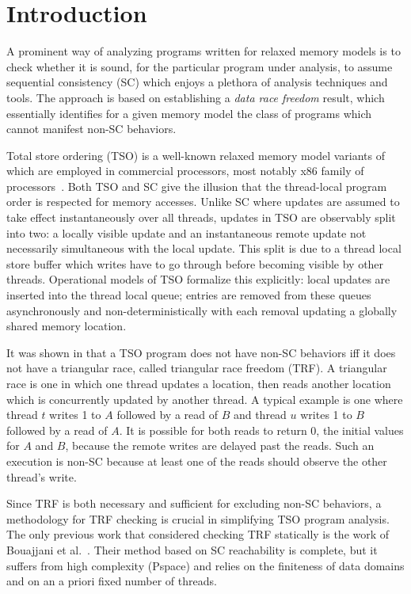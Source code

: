 \documentclass[preprint,9pt]{sigplanconf}
\begin{document}


\section{Introduction}
\label{sec:intro}
A prominent way of analyzing programs written for relaxed memory models is to check whether it is sound, for the particular program under analysis, to assume sequential consistency (SC) which enjoys a plethora of analysis techniques and tools.
The approach is based on establishing a {\em data race freedom} result, which essentially identifies for a given memory model the class of programs which cannot manifest non-SC behaviors.

Total store ordering (TSO) is a well-known relaxed memory model variants of which are employed in commercial processors, most notably x86 family of processors~\cite{SSO+2010}.
Both TSO and SC give the illusion that the thread-local program order is respected for memory accesses.
Unlike SC where updates are assumed to take effect instantaneously over all threads, updates in TSO are observably split into two: a locally visible update and an instantaneous remote update not necessarily simultaneous with the local update.
This split is due to a thread local store buffer which writes have to go through before becoming visible by other threads.
Operational models of TSO formalize this explicitly: local updates are inserted into the thread local queue; entries are removed from these queues asynchronously and non-deterministically with each removal updating a globally shared memory location. 

It was shown in \cite{Owe2010} that a TSO program does not have non-SC behaviors iff it does not have a triangular race, called triangular race freedom (TRF).
A triangular race is one in which one thread updates a location, then reads another location which is concurrently updated by another thread.
A typical example is one where thread $t$ writes 1 to $A$ followed by a read of $B$ and thread $u$ writes 1 to $B$ followed by a read of $A$.
It is possible for both reads to return 0, the initial values for $A$ and $B$, because the remote writes are delayed past the reads.
Such an execution is non-SC because at least one of the reads should observe the other thread's write.

Since TRF is both necessary and sufficient for excluding non-SC behaviors, a methodology for TRF checking is crucial in simplifying TSO program analysis.
The only previous work that considered checking TRF statically is the work of Bouajjani et al.~\cite{BDM2013}.
Their method based on SC reachability is complete, but it suffers from high complexity ({\sc\small Pspace}) and relies on the finiteness of data domains and on an a priori fixed number of threads.
\end{document}
